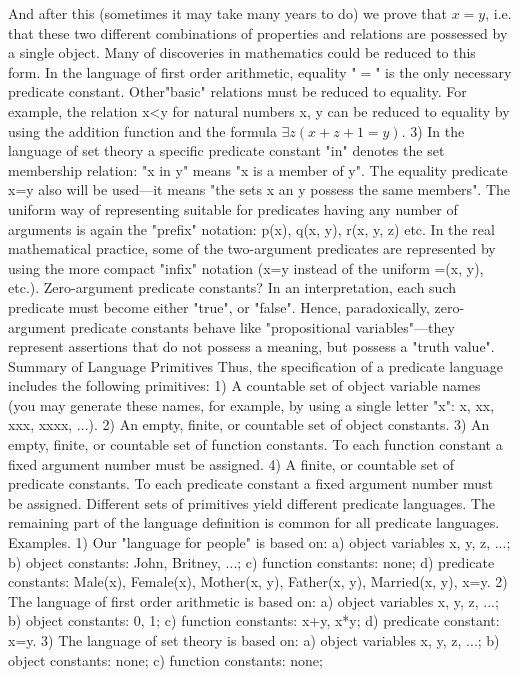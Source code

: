And after this (sometimes it may take many years to do) we prove that \(x=y\), i.e. that these two different combinations of
properties and relations are possessed by a single object. Many of discoveries in mathematics could be reduced to this form.
In the language of first order arithmetic, equality "\(=\)" is the only necessary predicate constant. Other"basic" relations must be
reduced to equality. For example, the relation x<y for natural numbers x, y can be reduced to equality by using the addition
function and the formula \(\exists z(x+z+1=y)\).
3) In the language of set theory a specific predicate constant "in" denotes the set membership relation: "x in y" means "x is a
member of y". The equality predicate x=y also will be used---it means "the sets x an y possess the same members".
The uniform way of representing suitable for predicates having any number of arguments is again the
"prefix" notation: p(x), q(x, y), r(x, y, z) etc. In the real mathematical practice, some of the two-argument
predicates are represented by using the more compact "infix" notation (x=y instead of the uniform =(x, y),
etc.).
Zero-argument predicate constants? In an interpretation, each such predicate must become either "true", or "false". Hence,
paradoxically, zero-argument predicate constants behave like "propositional variables"---they represent assertions that do not
possess a meaning, but possess a "truth value".
Summary of Language Primitives
Thus, the specification of a predicate language includes the following primitives:
1) A countable set of object variable names (you may generate these names, for example, by using a
single letter "x": x, xx, xxx, xxxx, ...).
2) An empty, finite, or countable set of object constants.
3) An empty, finite, or countable set of function constants. To each function constant a fixed argument
number must be assigned.
4) A finite, or countable set of predicate constants. To each predicate constant a fixed argument number
must be assigned.
Different sets of primitives yield different predicate languages. The remaining part of the language
definition is common for all predicate languages.
Examples. 1) Our "language for people" is based on: a) object variables x, y, z, ...; b) object constants: John, Britney, ...; c)
function constants: none; d) predicate constants: Male(x), Female(x), Mother(x, y), Father(x, y), Married(x, y), x=y.
2) The language of first order arithmetic is based on: a) object variables x, y, z, ...; b) object constants: 0, 1; c) function
constants: x+y, x*y; d) predicate constant: x=y.
3) The language of set theory is based on: a) object variables x, y, z, ...; b) object constants: none; c) function constants: none;
